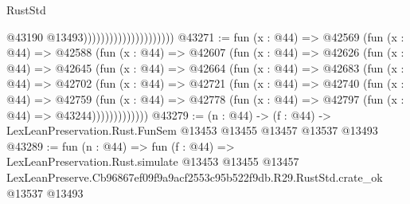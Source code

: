 \begin{lexlean}{RustStd}
\begin{coremodule}
                                              @43190
                                              @13493)))))))))))))))))))))
@43271 := fun (x : @44) =>
  @42569
    (fun (x : @44) =>
    @42588
      (fun (x : @44) =>
      @42607
        (fun (x : @44) =>
        @42626
          (fun (x : @44) =>
          @42645
            (fun (x : @44) =>
            @42664
              (fun (x : @44) =>
              @42683
                (fun (x : @44) =>
                @42702
                  (fun (x : @44) =>
                  @42721
                    (fun (x : @44) =>
                    @42740
                      (fun (x : @44) =>
                      @42759
                        (fun (x : @44) =>
                        @42778 (fun (x : @44) => @42797 (fun (x : @44) => @43244)))))))))))))
@43279 := (n : @44) ->
  (f : @44) -> LexLeanPreservation.Rust.FunSem @13453 @13455 @13457 @13537 @13493
@43289 := fun (n : @44) =>
  fun (f : @44) =>
  LexLeanPreservation.Rust.simulate
    @13453
    @13455
    @13457
    LexLeanPreserve.Cb96867ef09f9a9acf2553c95b522f9db.R29.RustStd.crate_ok
    @13537
    @13493
\end{coremodule}
\end{lexlean}
